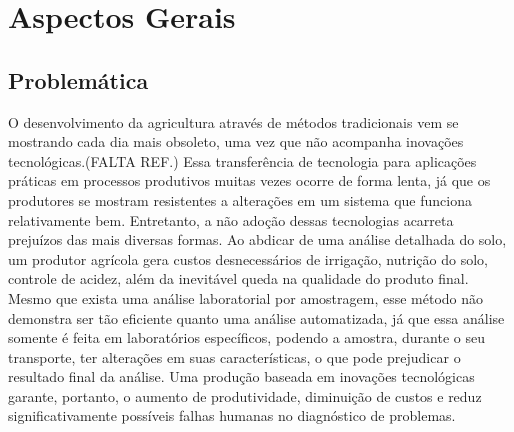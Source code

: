 
\chapter[Aspectos Gerais]{Aspectos Gerais}

\section{Problemática}

O desenvolvimento da agricultura através de métodos tradicionais vem se mostrando cada dia mais obsoleto, uma vez que não acompanha inovações tecnológicas.(FALTA REF.) Essa transferência de tecnologia para aplicações práticas em processos produtivos muitas vezes ocorre de forma lenta, já que os produtores se mostram resistentes a alterações em um sistema que funciona relativamente bem. Entretanto, a não adoção dessas tecnologias acarreta prejuízos das mais diversas formas. Ao abdicar de uma análise detalhada do solo, um produtor agrícola gera custos desnecessários de irrigação, nutrição do solo, controle de acidez, além da inevitável queda na qualidade do produto final. Mesmo que exista uma análise laboratorial por amostragem, esse método não demonstra ser tão eficiente quanto uma análise automatizada, já que essa análise somente é feita em laboratórios específicos, podendo a amostra, durante o seu transporte, ter alterações em suas características, o que pode prejudicar o resultado final da análise. Uma produção baseada em inovações tecnológicas garante, portanto, o aumento de produtividade, diminuição de custos e reduz significativamente possíveis falhas humanas no diagnóstico de problemas.

